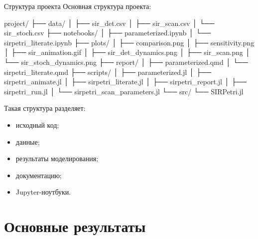 \documentclass[
  ignorenonframetext,
  aspectratio=169,
  russian,
]{beamer}
\newenvironment{Shaded}{\begin{snugshade}}{\end{snugshade}}
\newcommand{\NormalTok}[1]{\textcolor[rgb]{0.00,0.23,0.31}{#1}}
\providecommand{\tightlist}{%
  \setlength{\itemsep}{0pt}\setlength{\parskip}{0pt}}
\begin{document}
\begin{frame}[fragile]{Структура проекта}
Основная структура проекта:

\begin{Shaded}
\begin{Highlighting}[]
\NormalTok{project/}
\NormalTok{├── data/}
\NormalTok{│   ├── sir\_det.csv}
\NormalTok{│   ├── sir\_scan.csv}
\NormalTok{│   └── sir\_stoch.csv}
\NormalTok{├── notebooks/}
\NormalTok{│   ├── parameterized.ipynb}
\NormalTok{│   └── sirpetri\_literate.ipynb}
\NormalTok{├── plots/}
\NormalTok{│   ├── comparison.png}
\NormalTok{│   ├── sensitivity.png}
\NormalTok{│   ├── sir\_animation.gif}
\NormalTok{│   ├── sir\_det\_dynamics.png}
\NormalTok{│   ├── sir\_scan.png}
\NormalTok{│   └── sir\_stoch\_dynamics.png}
\NormalTok{├── report/}
\NormalTok{│   ├── parameterized.qmd}
\NormalTok{│   └── sirpetri\_literate.qmd}
\NormalTok{├── scripts/}
\NormalTok{│   ├── parameterized.jl}
\NormalTok{│   ├── sirpetri\_animate.jl}
\NormalTok{│   ├── sirpetri\_literate.jl}
\NormalTok{│   ├── sirpetri\_report.jl}
\NormalTok{│   ├── sirpetri\_run.jl}
\NormalTok{│   └── sirpetri\_scan\_parameters.jl}
\NormalTok{└── src/}
\NormalTok{    └── SIRPetri.jl}
\end{Highlighting}
\end{Shaded}

Такая структура разделяет:

\begin{itemize}[<+->]
\tightlist
\item
  исходный код;
\item
  данные;
\item
  результаты моделирования;
\item
  документацию;
\item
  Jupyter-ноутбуки.
\end{itemize}
\end{frame}

\section{Основные
результаты}\label{ux43eux441ux43dux43eux432ux43dux44bux435-ux440ux435ux437ux443ux43bux44cux442ux430ux442ux44b}
\end{document}

